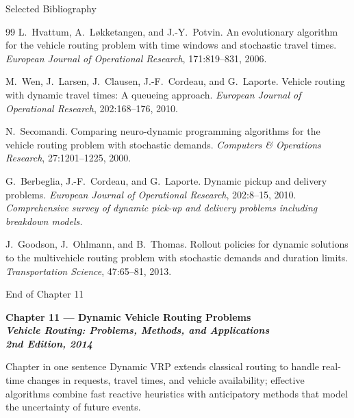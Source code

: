 \documentclass[aspectratio=169,10pt]{beamer}
\begin{document}
\begin{frame}[allowframebreaks]{Selected Bibliography}
\begin{thebibliography}{99}
    L.~Hvattum, A.~L\o kketangen, and J.-Y.~Potvin.
    \newblock An evolutionary algorithm for the vehicle routing problem
    with time windows and stochastic travel times.
    \newblock \emph{European Journal of Operational Research}, 171:819--831, 2006.

    M.~Wen, J.~Larsen, J.~Clausen, J.-F.~Cordeau, and G.~Laporte.
    \newblock Vehicle routing with dynamic travel times: A queueing approach.
    \newblock \emph{European Journal of Operational Research}, 202:168--176, 2010.

    N.~Secomandi.
    \newblock Comparing neuro-dynamic programming algorithms for the vehicle
    routing problem with stochastic demands.
    \newblock \emph{Computers \& Operations Research}, 27:1201--1225, 2000.

    G.~Berbeglia, J.-F.~Cordeau, and G.~Laporte.
    \newblock Dynamic pickup and delivery problems.
    \newblock \emph{European Journal of Operational Research}, 202:8--15, 2010.
    \newblock \textit{Comprehensive survey of dynamic pick-up and delivery
                      problems including breakdown models.}

    J.~Goodson, J.~Ohlmann, and B.~Thomas.
    \newblock Rollout policies for dynamic solutions to the multivehicle
    routing problem with stochastic demands and duration limits.
    \newblock \emph{Transportation Science}, 47:65--81, 2013.

  \end{thebibliography}

\end{frame}

\begin{frame}[allowframebreaks]{End of Chapter 11}
  \begin{center}
    \Large\bfseries
    Chapter 11 — Dynamic Vehicle Routing Problems\\[1em]
    \normalsize
    \textit{Vehicle Routing: Problems, Methods, and Applications}\\
    \textit{2nd Edition, 2014}\\[2em]

    \begin{block}{Chapter in one sentence}
      Dynamic VRP extends classical routing to handle real-time changes in
      requests, travel times, and vehicle availability; effective algorithms
      combine fast reactive heuristics with anticipatory methods that model
      the uncertainty of future events.
    \end{block}
  \end{center}
\end{frame}
\end{document}
